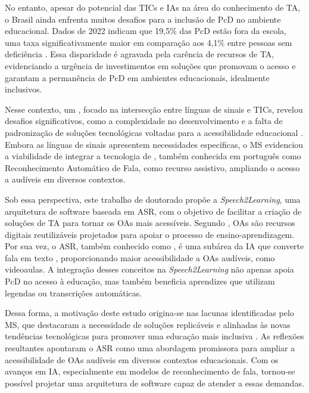 No entanto, apesar do potencial das TICs e IAs na área do conhecimento de TA, o Brasil ainda enfrenta muitos desafios para a inclusão de PcD no ambiente educacional. Dados de 2022 indicam que 19,5\% das PcD estão fora da escola, uma taxa significativamente maior em comparação aos 4,1\% entre pessoas sem deficiência \cite{IBGE2023}. Essa disparidade é agravada pela carência de recursos de TA, evidenciando a urgência de investimentos em soluções que promovam o acesso e garantam a permanência de PcD em ambientes educacionais, idealmente inclusivos.

Nesse contexto, um , focado na intersecção entre línguas de sinais e TICs, revelou desafios significativos, como a complexidade no desenvolvimento e a falta de padronização de soluções tecnológicas voltadas para a acessibilidade educacional \cite{FalvoJr2020_FIE, FalvoJr2020_SBIE, FalvoJr2021_RENOTE}. Embora as línguas de sinais apresentem necessidades específicas, o MS evidenciou a viabilidade de integrar a tecnologia de , também conhecida em português como Reconhecimento Automático de Fala, como recurso assistivo, ampliando o acesso a  audíveis em diversos contextos.

Sob essa perspectiva, este trabalho de doutorado propõe a \textit{Speech2Learning}, uma arquitetura de software baseada em ASR, com o objetivo de facilitar a criação de soluções de TA para tornar os OAs mais acessíveis. Segundo , OAs são recursos digitais reutilizáveis projetados para apoiar o processo de ensino-aprendizagem. Por sua vez, o ASR, também conhecido como , é uma subárea da IA que converte fala em texto \cite{Jurafsky2024}, proporcionando maior acessibilidade a OAs audíveis, como videoaulas. A integração desses conceitos na \textit{Speech2Learning} não apenas apoia PcD no acesso à educação, mas também beneficia aprendizes que utilizam legendas ou transcrições automáticas.

Dessa forma, a motivação deste estudo origina-se nas lacunas identificadas pelo MS, que destacaram a necessidade de soluções replicáveis e alinhadas às novas tendências tecnológicas para promover uma educação mais inclusiva \cite{FalvoJr2021_RENOTE}. As reflexões resultantes apontaram o ASR como uma abordagem promissora para ampliar a acessibilidade de OAs audíveis em diversos contextos educacionais. Com os avanços em IA, especialmente em modelos de reconhecimento de fala, tornou-se possível projetar uma arquitetura de software capaz de atender a essas demandas.

